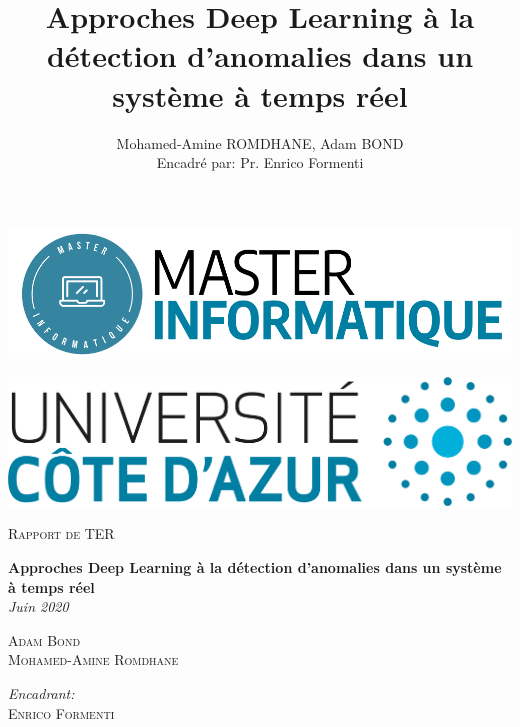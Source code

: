 \documentclass[french]{article}
\title{Approches Deep Learning à la détection d'anomalies dans un système à temps réel}
\author{Mohamed-Amine ROMDHANE, Adam BOND\\Encadré par: Pr. Enrico Formenti}
\date{}
\theoremstyle{mytheoremstyle}
\theoremstyle{mytheoremstyle}
\theoremstyle{myproblemstyle}
\begin{document}
    
    \begin{titlepage}
        \begin{center}

            \begin{minipage}{0.45\textwidth}
                \begin{flushright} 
                    \includegraphics[width=\linewidth]{images/master.png}
                \end{flushright}
            \end{minipage}
            \hfill
            \begin{minipage}{0.4\textwidth}
                \begin{flushleft} 
                    \includegraphics[width=\linewidth]{images/uca.png}
                \end{flushleft} 
            \end{minipage}
            

            
            \vfill            
            \vfill            
        
            \textsc{\Large Rapport de TER}
            
            \vfill
        
            \textbf{\huge Approches Deep Learning à la détection d’anomalies dans un système à temps réel}\\ 
        
            \vfill
            \vfill
            \Large \textit{Juin 2020}
            \vfill
        
            \begin{minipage}{0.49\textwidth}
              \begin{flushleft} 
                \Large \textsc{Adam Bond}\\
                \Large \textsc{Mohamed-Amine Romdhane}
              \end{flushleft}
            \end{minipage}
            \begin{minipage}{0.49\textwidth}
              \begin{flushright} 
                \Large \emph{ Encadrant:}\\
                \textsc{Enrico Formenti}
              \end{flushright}
            \end{minipage}
        

\end{center}
\end{titlepage}
\end{document}

